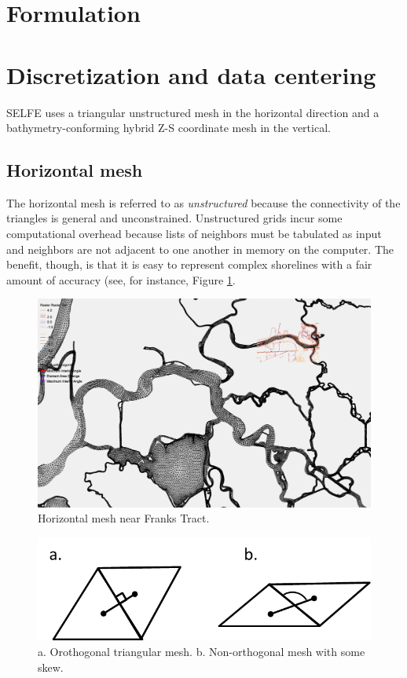 \section{Formulation}


%



\section{Discretization and data centering}
SELFE uses a triangular unstructured mesh in the horizontal direction and a bathymetry-conforming 
hybrid Z-S coordinate mesh \citep{Zhang08} in the vertical.

\subsection{Horizontal mesh}
The horizontal mesh is referred to as {\em unstructured} because the connectivity of the triangles 
is general and unconstrained. 
Unstructured grids incur some computational overhead because lists of neighbors must be tabulated as input and neighbors 
are not adjacent to one another in memory on the computer. The benefit, though, is that it is 
easy to represent complex shorelines with a fair amount of accuracy (see, for instance, Figure \ref{fig:hgrid}.

\begin{figure}
	\centering
		\includegraphics[width=\textwidth,clip,trim=3in 0in 2.5in 4.25in]{image/hgrid}
	\caption{Horizontal mesh near Franks Tract.}
	\label{fig:hgrid}
\end{figure}

\begin{figure}
	\centering
		\includegraphics[scale=1.0]{image/ortho}
	\caption{a. Orothogonal triangular mesh. b. Non-orthogonal mesh with some skew.}
	\label{fig:ortho}
\end{figure}


